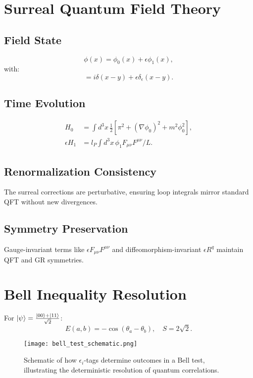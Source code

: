 \documentclass{article}
\begin{document}
\section{Surreal Quantum Field Theory}
\subsection{Field State}
\begin{equation}
\phi(x) = \phi_0(x) + \epsilon \phi_1(x),
\end{equation}
with:
\begin{equation}
[\phi(x), \pi(y)] = i \delta(x-y) + \epsilon \delta_\epsilon(x-y).
\end{equation}

\subsection{Time Evolution}
\begin{align}
H_0 &= \int d^3x \, \frac{1}{2} [\pi^2 + (\nabla \phi_0)^2 + m^2 \phi_0^2], \\
\epsilon H_1 &= l_P \int d^3x \, \phi_1 F_{\mu\nu} F^{\mu\nu} / L.
\end{align}

\subsection{Renormalization Consistency}
The surreal corrections are perturbative, ensuring loop integrals mirror standard QFT without new divergences.

\subsection{Symmetry Preservation}
Gauge-invariant terms like \(\epsilon F_{\mu\nu} F^{\mu\nu}\) and diffeomorphism-invariant \(\epsilon R^q\) maintain QFT and GR symmetries.

\section{Bell Inequality Resolution}
For \(\ket{\psi} = \frac{\ket{00} + \ket{11}}{\sqrt{2}}\):
\begin{equation}
E(a,b) = -\cos(\theta_a - \theta_b), \quad S = 2\sqrt{2}.
\end{equation}

\begin{figure}[h]
    \centering
    \texttt{[image: bell\_test\_schematic.png]}
    \caption{Schematic of how \(\epsilon_i\)-tags determine outcomes in a Bell test, illustrating the deterministic resolution of quantum correlations.}
    \label{fig:bell_test}
\end{figure}
\end{document}

